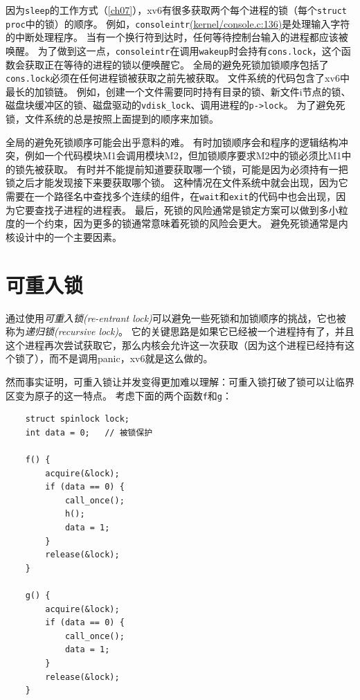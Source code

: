 因为\texttt{sleep}的工作方式（\autoref{ch07}），xv6有很多获取两个每个进程的锁（每个\texttt{struct proc}中的锁）的顺序。
例如，\texttt{consoleintr}\href{https://github.com/mit-pdos/xv6-riscv/blob/risc/kernel/console.c#L136}{(kernel/console.c:136)}是处理输入字符的中断处理程序。
当有一个换行符到达时，任何等待控制台输入的进程都应该被唤醒。
为了做到这一点，\texttt{consoleintr}在调用\texttt{wakeup}时会持有\texttt{cons.lock}，这个函数会获取正在等待的进程的锁以便唤醒它。
全局的避免死锁加锁顺序包括了\texttt{cons.lock}必须在任何进程锁被获取之前先被获取。
文件系统的代码包含了xv6中最长的加锁链。
例如，创建一个文件需要同时持有目录的锁、新文件i节点的锁、磁盘块缓冲区的锁、磁盘驱动的\texttt{vdisk\_lock}、调用进程的\texttt{p->lock}。
为了避免死锁，文件系统的总是按照上面提到的顺序来加锁。

全局的避免死锁顺序可能会出乎意料的难。
有时加锁顺序会和程序的逻辑结构冲突，例如一个代码模块M1会调用模块M2，但加锁顺序要求M2中的锁必须比M1中的锁先被获取。
有时并不能提前知道要获取哪一个锁，可能是因为必须持有一把锁之后才能发现接下来要获取哪个锁。
这种情况在文件系统中就会出现，因为它需要在一个路径名中查找多个连续的组件，在\texttt{wait}和\texttt{exit}的代码中也会出现，因为它要查找子进程的进程表。
最后，死锁的风险通常是锁定方案可以做到多小粒度的一个约束，因为更多的锁通常意味着死锁的风险会更大。
避免死锁通常是内核设计中的一个主要因素。

\section{可重入锁}
通过使用\emph{可重入锁(re-entrant lock)}可以避免一些死锁和加锁顺序的挑战，它也被称为\emph{递归锁(recursive lock)}。
它的关键思路是如果它已经被一个进程持有了，并且这个进程再次尝试获取它，那么内核会允许这一次获取（因为这个进程已经持有这个锁了），而不是调用panic，xv6就是这么做的。

然而事实证明，可重入锁让并发变得更加难以理解：可重入锁打破了锁可以让临界区变为原子的这一特点。
考虑下面的两个函数\texttt{f}和\texttt{g}：
\begin{lstlisting}
    struct spinlock lock;
    int data = 0;   // 被锁保护
    
    f() {
        acquire(&lock);
        if (data == 0) {
            call_once();
            h();
            data = 1;
        }
        release(&lock);
    }

    g() {
        acquire(&lock);
        if (data == 0) {
            call_once();
            data = 1;
        }
        release(&lock);
    }
\end{lstlisting}

